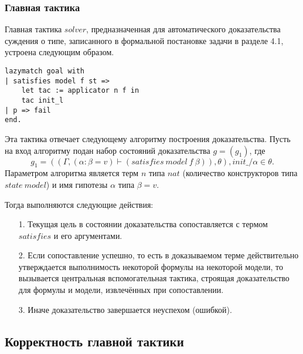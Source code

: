 \documentclass[12pt]{article}
\begin{document}


\subsubsection{Главная тактика}
Главная тактика $solver$, предназначенная для автоматического доказательства суждения о типе, записанного в формальной постановке задачи в разделе 4.1, устроена следующим образом.

\begin{verbatim}
lazymatch goal with
| satisfies model f st => 
    let tac := applicator n f in 
    tac init_l
| p => fail
end.
\end{verbatim}
Эта тактика отвечает следующему алгоритму построения доказательства.
Пусть на вход алгоритму подан набор состояний доказательства $g = (g_1)$, где $$g_1 = ((\Gamma, (\alpha: \beta = v) \vdash (satisfies\ model\ f\ \beta)), \theta), init\_/\alpha \in \theta.$$
Параметром алгоритма является терм $n$ типа $nat$ (количество конструкторов типа $state\ model$) и имя гипотезы $\alpha$ типа $\beta = v$.

Тогда выполняются следующие действия:
\begin{enumerate}
    \item[1.] Текущая цель в состоянии доказательства сопоставляется с термом $satisfies$ и его аргументами.
    \item[2.] Если сопоставление успешно, то есть в доказываемом терме действительно утверждается выполнимость некоторой формулы на некоторой модели, то вызывается центральная вспомогательная тактика, строящая доказательство для формулы и модели, извлечённых при сопоставлении.
    \item[3.] Иначе доказательство завершается неуспехом (ошибкой).
\end{enumerate}


\subsection{Корректность главной тактики}
\end{document}
